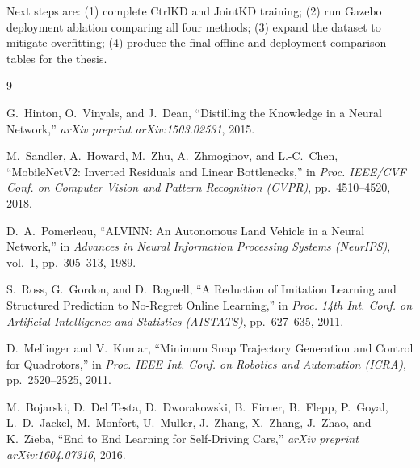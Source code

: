 \documentclass[12pt,a4paper]{article}
\begin{document}
Next steps are: (1) complete CtrlKD and JointKD training; (2) run Gazebo deployment
ablation comparing all four methods; (3) expand the dataset to mitigate overfitting;
(4) produce the final offline and deployment comparison tables for the thesis.

\begin{thebibliography}{9}

G.~Hinton, O.~Vinyals, and J.~Dean,
``Distilling the Knowledge in a Neural Network,''
\textit{arXiv preprint arXiv:1503.02531}, 2015.

M.~Sandler, A.~Howard, M.~Zhu, A.~Zhmoginov, and L.-C.~Chen,
``MobileNetV2: Inverted Residuals and Linear Bottlenecks,''
in \textit{Proc. IEEE/CVF Conf. on Computer Vision and Pattern Recognition (CVPR)},
pp.~4510--4520, 2018.

D.~A.~Pomerleau,
``ALVINN: An Autonomous Land Vehicle in a Neural Network,''
in \textit{Advances in Neural Information Processing Systems (NeurIPS)},
vol.~1, pp.~305--313, 1989.

S.~Ross, G.~Gordon, and D.~Bagnell,
``A Reduction of Imitation Learning and Structured Prediction to No-Regret Online Learning,''
in \textit{Proc. 14th Int. Conf. on Artificial Intelligence and Statistics (AISTATS)},
pp.~627--635, 2011.

D.~Mellinger and V.~Kumar,
``Minimum Snap Trajectory Generation and Control for Quadrotors,''
in \textit{Proc. IEEE Int. Conf. on Robotics and Automation (ICRA)},
pp.~2520--2525, 2011.

M.~Bojarski, D.~Del Testa, D.~Dworakowski, B.~Firner, B.~Flepp, P.~Goyal,
L.~D.~Jackel, M.~Monfort, U.~Muller, J.~Zhang, X.~Zhang, J.~Zhao, and K.~Zieba,
``End to End Learning for Self-Driving Cars,''
\textit{arXiv preprint arXiv:1604.07316}, 2016.

\end{thebibliography}
\end{document}
